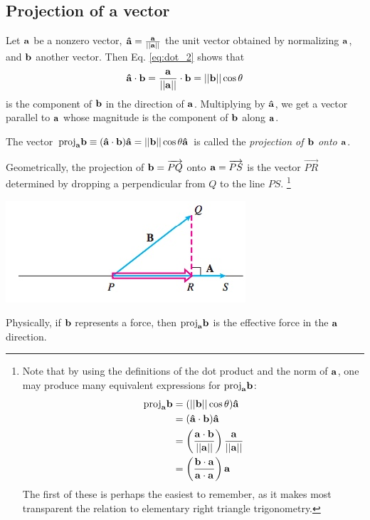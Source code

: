 \documentclass[12pt,letterpaper,reqno]{article}
\numberwithin{equation}{section}
\newcommand{\ti}[1]{\textit{#1}}
\begin{document}
\subsection{Projection of a vector}
Let ${\bf a}$ be a nonzero vector, ${\bf \hat{a}}=\frac{{\bf a}}{||{\bf a}||}$ the unit vector obtained by normalizing ${\bf a}$, and ${\bf b}$ another vector. Then Eq. \eqref{eq:dot_2} shows that
\begin{align*}
	{\bf \hat{a}}\cdot {\bf b}=\frac{{\bf a}}{||{\bf a}||} \cdot {\bf b}=||{\bf b}||\cos \theta
\end{align*} 
is the component of ${\bf b}$ in the direction of ${\bf a}$. Multiplying by ${\bf \hat{a}}$, we get a vector parallel to ${\bf a}$ whose magnitude is the component of ${\bf b}$ along ${\bf a}$.

\begin{defn}
	The vector $\text{proj}_{\bf a}{\bf b}\equiv ({\bf \hat{a}}\cdot {\bf b}){\bf \hat{a}}=||{\bf b}||\cos \theta {\bf \hat{a}}$ is called the \ti{projection of ${\bf b}$ onto ${\bf a}$}.
\end{defn}
Geometrically, the projection of ${\bf b}=\overrightarrow{PQ}$ onto ${\bf a}=\overrightarrow{PS}$ is the vector $\overrightarrow{PR}$ determined by dropping a perpendicular from $Q$ to the line $PS$. \footnote{Note that by using the definitions of the dot product and the norm of ${\bf a}$, one may produce many equivalent expressions for $\text{proj}_{\bf a}{\bf b}$:
\begin{align*}
	\text{proj}_{\bf a}{\bf b}&=(||{\bf b}||\cos \theta){\bf \hat{a}} \\
	&=({\bf \hat{a}}\cdot {\bf b}){\bf \hat{a}} \\
	&=\left(\frac{{\bf a}\cdot {\bf b}}{||{\bf a}||}\right)\frac{{\bf a}}{||{\bf a}||} \\
	&=\left(\frac{{\bf b}\cdot {\bf a}}{{\bf a}\cdot {\bf a}}\right){\bf a}
\end{align*}
The first of these is perhaps the easiest to remember, as it makes most transparent the relation to elementary right triangle trigonometry.}

\begin{center}
	\includegraphics[scale=0.5]{figures_mvc/vector_projection_def}
\end{center}
Physically, if ${\bf b}$ represents a force, then $\text{proj}_{\bf a}{\bf b}$ is the effective force in the ${\bf a}$ direction.
\end{document}
